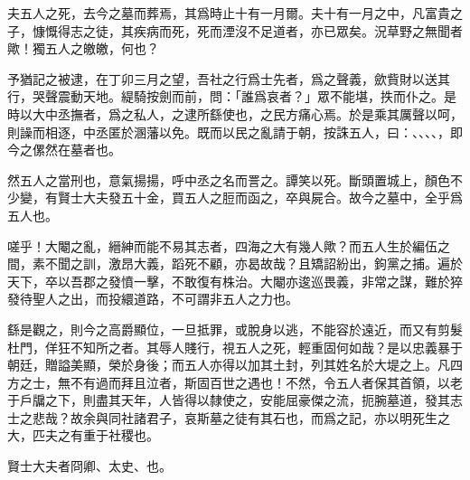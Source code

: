 夫五人之死，去今之墓而葬焉，其爲時止十有一月爾。夫十有一月之中，凡富貴之子，慷慨得志之徒，其疾病而死，死而湮沒不足道者，亦已眾矣。況草野之無聞者歟！獨五人之皦皦，何也？

予猶記之被逮，在丁卯三月之望，吾社之行爲士先者，爲之聲義，歛貲財以送其行，哭聲震動天地。緹騎按劍而前，問：「誰爲哀者？」眾不能堪，抶而仆之。是時以大中丞撫者，爲之私人，之逮所繇使也，之民方痛心焉。於是乘其厲聲以呵，則譟而相逐，中丞匿於溷藩以免。既而以民之亂請于朝，按誅五人，曰：、、、、，即今之傫然在墓者也。

然五人之當刑也，意氣揚揚，呼中丞之名而詈之。譚笑以死。斷頭置城上，顏色不少變，有賢士大夫發五十金，買五人之脰而函之，卒與屍合。故今之墓中，全乎爲五人也。

嗟乎！大閹之亂，縉紳而能不易其志者，四海之大有幾人歟？而五人生於編伍之間，素不聞之訓，激昂大義，蹈死不顧，亦曷故哉？且矯詔紛出，鉤黨之捕。遍於天下，卒以吾郡之發憤一擊，不敢復有株治。大閹亦逡巡畏義，非常之謀，難於猝發待聖人之出，而投繯道路，不可謂非五人之力也。

繇是觀之，則今之高爵顯位，一旦抵罪，或脫身以逃，不能容於遠近，而又有剪髮杜門，佯狂不知所之者。其辱人賤行，視五人之死，輕重固何如哉？是以忠義暴于朝廷，贈謚美顯，榮於身後；而五人亦得以加其土封，列其姓名於大堤之上。凡四方之士，無不有過而拜且泣者，斯固百世之遇也！不然，令五人者保其首領，以老于戶牖之下，則盡其天年，人皆得以隸使之，安能屈豪傑之流，扼腕墓道，發其志士之悲哉？故余與同社諸君子，哀斯墓之徒有其石也，而爲之記，亦以明死生之大，匹夫之有重于社稷也。

賢士大夫者冏卿、太史、也。

\theendnotes

